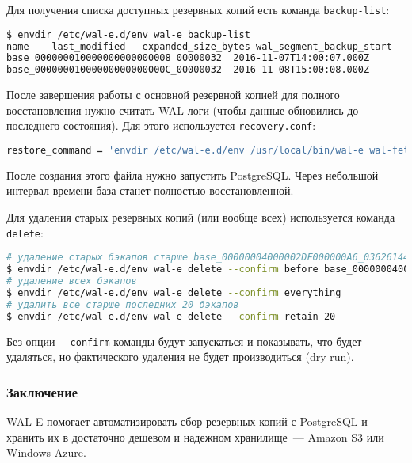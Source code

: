 Для получения списка доступных резервных копий есть команда \lstinline!backup-list!:

\begin{lstlisting}[language=Bash,label=lst:wal-e12,caption=Список резервных копий]
$ envdir /etc/wal-e.d/env wal-e backup-list
name	last_modified	expanded_size_bytes	wal_segment_backup_start	wal_segment_offset_backup_start	wal_segment_backup_stop	wal_segment_offset_backup_stop
base_000000010000000000000008_00000032	2016-11-07T14:00:07.000Z		000000010000000000000008	00000032
base_00000001000000000000000C_00000032	2016-11-08T15:00:08.000Z		00000001000000000000000C	00000032
\end{lstlisting}

После завершения работы с основной резервной копией для полного восстановления нужно считать WAL-логи (чтобы данные обновились до последнего состояния). Для этого используется \lstinline!recovery.conf!:

\begin{lstlisting}[language=Bash,label=lst:wal-e13,caption=recovery.conf]
restore_command = 'envdir /etc/wal-e.d/env /usr/local/bin/wal-e wal-fetch "%f" "%p"'
\end{lstlisting}

После создания этого файла нужно запустить PostgreSQL. Через небольшой интервал времени база станет полностью восстановленной.

Для удаления старых резервных копий (или вообще всех) используется команда \lstinline!delete!:

\begin{lstlisting}[language=Bash,label=lst:wal-e14,caption=Удаление резервных копий]
# удаление старых бэкапов старше base_00000004000002DF000000A6_03626144
$ envdir /etc/wal-e.d/env wal-e delete --confirm before base_00000004000002DF000000A6_03626144
# удаление всех бэкапов
$ envdir /etc/wal-e.d/env wal-e delete --confirm everything
# удалить все старше последних 20 бэкапов
$ envdir /etc/wal-e.d/env wal-e delete --confirm retain 20
\end{lstlisting}

Без опции \lstinline!--confirm! команды будут запускаться и показывать, что будет удаляться, но фактического удаления не будет производиться (dry run).

\subsubsection{Заключение}

WAL-E помогает автоматизировать сбор резервных копий с PostgreSQL и хранить их в достаточно дешевом и надежном хранилище~--- Amazon S3 или Windows Azure.
